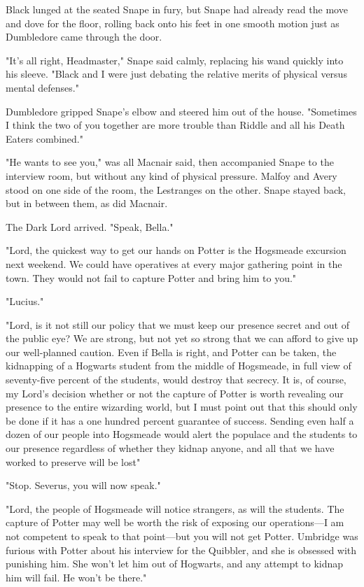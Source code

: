Black lunged at the seated Snape in fury, but Snape had already read the move and dove for the floor, rolling back onto his feet in one smooth motion just as Dumbledore came through the door.

"It's all right, Headmaster," Snape said calmly, replacing his wand quickly into his sleeve. "Black and I were just debating the relative merits of physical versus mental defenses."

Dumbledore gripped Snape's elbow and steered him out of the house. "Sometimes I think the two of you together are more trouble than Riddle and all his Death Eaters combined."

\sbreak

"He wants to see you," was all Macnair said, then accompanied Snape to the interview room, but without any kind of physical pressure. Malfoy and Avery stood on one side of the room, the Lestranges on the other. Snape stayed back, but in between them, as did Macnair.

The Dark Lord arrived. "Speak, Bella."

"Lord, the quickest way to get our hands on Potter is the Hogsmeade excursion next weekend. We could have operatives at every major gathering point in the town. They would not fail to capture Potter and bring him to you."

"Lucius."

"Lord, is it not still our policy that we must keep our presence secret and out of the public eye? We are strong, but not yet so strong that we can afford to give up our well-planned caution. Even if Bella is right, and Potter can be taken, the kidnapping of a Hogwarts student from the middle of Hogsmeade, in full view of seventy-five percent of the students, would destroy that secrecy. It is, of course, my Lord's decision whether or not the capture of Potter is worth revealing our presence to the entire wizarding world, but I must point out that this should only be done if it has a one hundred percent guarantee of success. Sending even half a dozen of our people into Hogsmeade would alert the populace and the students to our presence regardless of whether they kidnap anyone, and all that we have worked to preserve will be lost{\el}"

"Stop. Severus, you will now speak."

"Lord, the people of Hogsmeade will notice strangers, as will the students. The capture of Potter may well be worth the risk of exposing our operations—I am not competent to speak to that point—but you will not get Potter. Umbridge was furious with Potter about his interview for the Quibbler, and she is obsessed with punishing him. She won't let him out of Hogwarts, and any attempt to kidnap him will fail. He won't be there."


